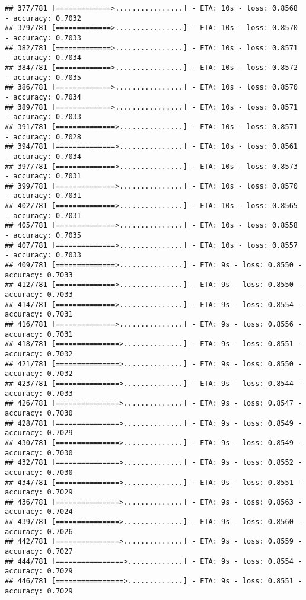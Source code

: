 \documentclass[
]{article}
\begin{document}
\begin{verbatim}
## 377/781 [=============>................] - ETA: 10s - loss: 0.8568 - accuracy: 0.7032
## 379/781 [=============>................] - ETA: 10s - loss: 0.8570 - accuracy: 0.7033
## 382/781 [=============>................] - ETA: 10s - loss: 0.8571 - accuracy: 0.7034
## 384/781 [=============>................] - ETA: 10s - loss: 0.8572 - accuracy: 0.7035
## 386/781 [=============>................] - ETA: 10s - loss: 0.8570 - accuracy: 0.7034
## 389/781 [=============>................] - ETA: 10s - loss: 0.8571 - accuracy: 0.7033
## 391/781 [==============>...............] - ETA: 10s - loss: 0.8571 - accuracy: 0.7028
## 394/781 [==============>...............] - ETA: 10s - loss: 0.8561 - accuracy: 0.7034
## 397/781 [==============>...............] - ETA: 10s - loss: 0.8573 - accuracy: 0.7031
## 399/781 [==============>...............] - ETA: 10s - loss: 0.8570 - accuracy: 0.7031
## 402/781 [==============>...............] - ETA: 10s - loss: 0.8565 - accuracy: 0.7031
## 405/781 [==============>...............] - ETA: 10s - loss: 0.8558 - accuracy: 0.7035
## 407/781 [==============>...............] - ETA: 10s - loss: 0.8557 - accuracy: 0.7033
## 409/781 [==============>...............] - ETA: 9s - loss: 0.8550 - accuracy: 0.7033 
## 412/781 [==============>...............] - ETA: 9s - loss: 0.8550 - accuracy: 0.7033
## 414/781 [==============>...............] - ETA: 9s - loss: 0.8554 - accuracy: 0.7031
## 416/781 [==============>...............] - ETA: 9s - loss: 0.8556 - accuracy: 0.7031
## 418/781 [===============>..............] - ETA: 9s - loss: 0.8551 - accuracy: 0.7032
## 421/781 [===============>..............] - ETA: 9s - loss: 0.8550 - accuracy: 0.7032
## 423/781 [===============>..............] - ETA: 9s - loss: 0.8544 - accuracy: 0.7033
## 426/781 [===============>..............] - ETA: 9s - loss: 0.8547 - accuracy: 0.7030
## 428/781 [===============>..............] - ETA: 9s - loss: 0.8549 - accuracy: 0.7029
## 430/781 [===============>..............] - ETA: 9s - loss: 0.8549 - accuracy: 0.7030
## 432/781 [===============>..............] - ETA: 9s - loss: 0.8552 - accuracy: 0.7030
## 434/781 [===============>..............] - ETA: 9s - loss: 0.8551 - accuracy: 0.7029
## 436/781 [===============>..............] - ETA: 9s - loss: 0.8563 - accuracy: 0.7024
## 439/781 [===============>..............] - ETA: 9s - loss: 0.8560 - accuracy: 0.7026
## 442/781 [===============>..............] - ETA: 9s - loss: 0.8559 - accuracy: 0.7027
## 444/781 [================>.............] - ETA: 9s - loss: 0.8554 - accuracy: 0.7029
## 446/781 [================>.............] - ETA: 9s - loss: 0.8551 - accuracy: 0.7029

\end{verbatim}
\end{document}

